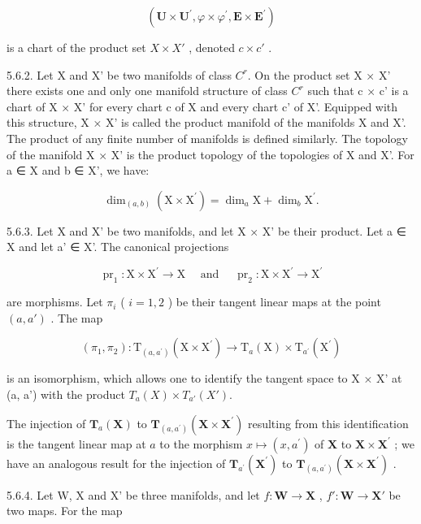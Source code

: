 \[
(\mathbf {U} \times \mathbf {U} ^ {\prime}, \varphi \times \varphi^ {\prime}, \mathbf {E} \times \mathbf {E} ^ {\prime})
\]

is a chart of the product set \(X \times X'\) , denoted \(c \times c'\) .

5.6.2. Let X and X' be two manifolds of class \(C^{r}\). On the product set X × X' there exists one and only one manifold structure of class \(C^{r}\) such that c × c' is a chart of X × X' for every chart c of X and every chart c' of X'. Equipped with this structure, X × X' is called the product manifold of the manifolds X and X'. The product of any finite number of manifolds is defined similarly. The topology of the manifold X × X' is the product topology of the topologies of X and X'. For a ∈ X and b ∈ X', we have:

\[
\dim_ {(a, b)} (\mathrm{X} \times \mathrm{X} ^ {\prime}) = \dim_ {a} \mathrm{X} + \dim_ {b} \mathrm{X} ^ {\prime}.
\]

5.6.3. Let X and X' be two manifolds, and let X × X' be their product. Let a ∈ X and let a' ∈ X'. The canonical projections

\[
\operatorname{pr} _ {1}: \mathrm{X} \times \mathrm{X} ^ {\prime} \rightarrow \mathrm{X} \quad \text { and } \quad \operatorname{pr} _ {2}: \mathrm{X} \times \mathrm{X} ^ {\prime} \rightarrow \mathrm{X} ^ {\prime}
\]

are morphisms. Let \(\pi_{i}\) ( \(i=1,2\) ) be their tangent linear maps at the point \((a,a')\) . The map

\[
(\pi_ {1}, \pi_ {2}): \mathrm{T} _ {(a, a ^ {\prime})} (\mathrm{X} \times \mathrm{X} ^ {\prime}) \rightarrow \mathrm{T} _ {a} (\mathrm{X}) \times \mathrm{T} _ {a ^ {\prime}} (\mathrm{X} ^ {\prime})
\]

is an isomorphism, which allows one to identify the tangent space to X × X' at (a, a') with the product \(T_{a}(X) \times T_{a'}(X')\).

The injection of \(\mathbf{T}_{a}(\mathbf{X})\) to \(\mathbf{T}_{(a,a^{\prime})}(\mathbf{X}\times \mathbf{X}^{\prime})\) resulting from this identification is the tangent linear map at \(a\) to the morphism \(x\mapsto (x,a^{\prime})\) of \(\mathbf{X}\) to \(\mathbf{X}\times \mathbf{X}^{\prime}\) ; we have an analogous result for the injection of \(\mathbf{T}_{a^{\prime}}(\mathbf{X}^{\prime})\) to \(\mathbf{T}_{(a,a^{\prime})}(\mathbf{X}\times \mathbf{X}^{\prime})\) .

5.6.4. Let W, X and X' be three manifolds, and let \(f: \mathbf{W} \to \mathbf{X}\) , \(f': \mathbf{W} \to \mathbf{X'}\) be two maps. For the map

